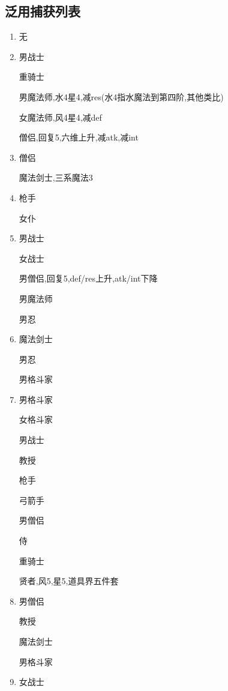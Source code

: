 	\subsection{泛用捕获列表}
	\begin{enumerate}\label{sec:泛用捕获列表}
		\item
		无
		\item
		男战士

		重骑士

		男魔法师,水4星4,减res(水4指水魔法到第四阶,其他类比)

		女魔法师,风4星4,减def

		僧侣,回复5,六维上升,减atk,减int

		\item
		{\color{red}{男忍,减hit,减spd,五系异常(毒眠麻忘魅)}}

		僧侣

		魔法剑士,三系魔法3
		
		\item
		枪手

		女仆

		{\color{red}{教授,星4,攻击属性上升(atk,int,hit,spd)}}

		\item
		男战士

		女战士

		男僧侣,回复5,def/res上升,atk/int下降

		男魔法师

		男忍

		\item
		魔法剑士

		男忍

		男格斗家

		\item
		男格斗家

		女格斗家

		男战士

		教授

		枪手

		弓箭手

		男僧侣

		侍

		重骑士

		贤者,风5,星5,道具界五件套
		
		\item
		男僧侣

		教授

		魔法剑士
		
		男格斗家

		\item
		女战士


\end{enumerate}
